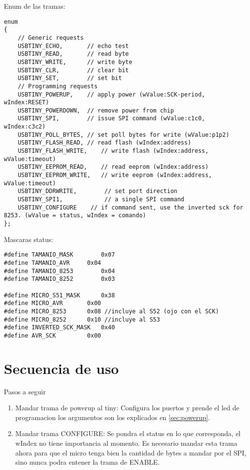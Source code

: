\documentclass[a4paper,10pt]{article}
\begin{document}
Enum de las tramas:

\begin{verbatim}
enum
{
	// Generic requests
	USBTINY_ECHO,		// echo test
	USBTINY_READ,		// read byte
	USBTINY_WRITE,		// write byte
	USBTINY_CLR,		// clear bit 
	USBTINY_SET,		// set bit
	// Programming requests
	USBTINY_POWERUP,	// apply power (wValue:SCK-period, wIndex:RESET)
	USBTINY_POWERDOWN,	// remove power from chip
	USBTINY_SPI,		// issue SPI command (wValue:c1c0, wIndex:c3c2)
	USBTINY_POLL_BYTES,	// set poll bytes for write (wValue:p1p2)
	USBTINY_FLASH_READ,	// read flash (wIndex:address)
	USBTINY_FLASH_WRITE,	// write flash (wIndex:address, wValue:timeout)
	USBTINY_EEPROM_READ,	// read eeprom (wIndex:address)
	USBTINY_EEPROM_WRITE,	// write eeprom (wIndex:address, wValue:timeout)
	USBTINY_DDRWRITE,        // set port direction
	USBTINY_SPI1,            // a single SPI command
	USBTINY_CONFIGURE	 // if command sent, use the inverted sck for
8253. (wValue = status, wIndex = comando)
};  \end{verbatim} 

Mascaras status:

\begin{verbatim}
#define TAMANIO_MASK		0x07
#define TAMANIO_AVR		0x04
#define TAMANIO_8253		0x04
#define TAMANIO_8252		0x03

#define MICRO_S51_MASK		0x38
#define MICRO_AVR		0x00
#define MICRO_8253		0x08 //incluye al S52 (ojo con el SCK)
#define	MICRO_8252		0x10 //incluye al S53
#define INVERTED_SCK_MASK	0x40	
#define AVR_SCK			0x00               			   
\end{verbatim} 



\section{Secuencia de uso}

Pasos a seguir
\begin{enumerate}
 \item Mandar trama de powerup al tiny: Configura los puertos y prende el led de
programacion los argumentos son los explicados en \ref{sec:powerup}.
\item Mandar trama CONFIGURE: Se pondra el status en lo que corresponda, el
wIndex no tiene importancia al momento. Es necesario mandar esta trama ahora
para que el micro tenga bien la cantidad de bytes a mandar por el SPI, sino
nunca podra entener la trama de ENABLE.
\end{enumerate}
\end{document}
